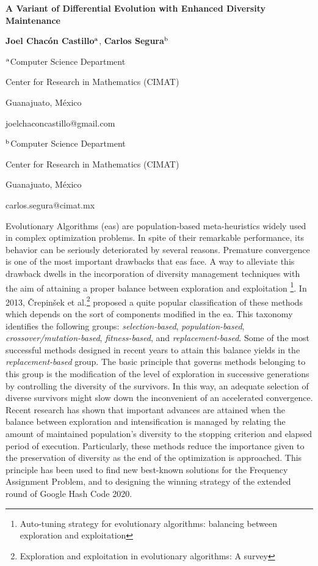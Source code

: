 \documentclass[a4paper,12pt]{article}
\newcommand{\EAS}{{\sc eas}}
\newcommand{\EA}{{\sc ea}}
\begin{document}
\centerline{\bf A Variant of Differential Evolution with Enhanced Diversity Maintenance}

\vspace{12pt}

\centerline{{\bf Joel Chac\'on Castillo$^{\rm a}$},  {\bf Carlos Segura$^{\rm b}$}}

\vspace{12pt}

\centerline{$^{\rm a}$Computer Science Department}
\centerline{Center for Research in Mathematics (CIMAT)}
\centerline{Guanajuato, M\'exico}
\centerline{joelchaconcastillo@gmail.com}

\vspace{12pt}

\centerline{$^{\rm b}$Computer Science Department}
\centerline{Center for Research in Mathematics (CIMAT)}
\centerline{Guanajuato, M\'exico}
\centerline{carlos.segura@cimat.mx}

\vspace{12pt}
\vspace{12pt}

Evolutionary Algorithms (\EAS{}) are population-based meta-heuristics widely used in complex optimization problems.
%
In spite of their remarkable performance, its behavior can be seriously deteriorated by several reasons.
%
Premature convergence is one of the most important drawbacks that \EAS{} face.
%
A way to alleviate this drawback dwells in the incorporation of diversity management techniques with the aim
of attaining a proper balance between exploration and exploitation \footnote{Auto-tuning strategy for evolutionary algorithms: balancing between exploration and exploitation}.
%
In 2013, {\v{C}}repin{\v{s}}ek et al.\footnote{Exploration and exploitation in evolutionary algorithms: A survey} proposed a quite 
popular classification of these methods which depends on the sort of components modified in the \EA{}.
%
This taxonomy identifies the following groups:
%
\textit{selection-based}, \textit{population-based}, \textit{crossover/mutation-based}, \textit{fitness-based}, and \textit{replacement-based}.
%
Some of the most successful methods designed in recent years to attain this balance yields in the \textit{replacement-based} group.
%
The basic principle that governs methods belonging to this group is the modification of the level of exploration in successive 
generations by controlling the diversity of the survivors.
%
In this way, an adequate selection of diverse survivors might slow down the inconvenient of an accelerated convergence.
%
Recent research has shown that important advances are attained when the balance between exploration and intensification 
is managed by relating the amount of maintained population's diversity to the stopping criterion and elapsed period of execution.
%
Particularly, these methods reduce the importance given to the preservation of diversity as the end of the optimization is approached.
%
This principle has been used to find new best-known solutions for the Frequency Assignment Problem, and to designing the winning 
strategy of the extended round of Google Hash Code 2020.
\end{document}

